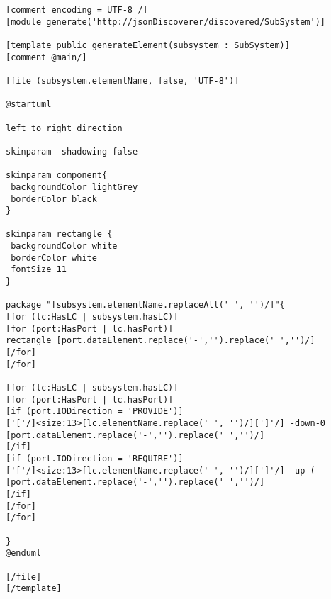 \begin{lstlisting}[caption=Acceleo template for generated textual description in PlantUML lanauge,label=code:acceleo_template_final]
[comment encoding = UTF-8 /]
[module generate('http://jsonDiscoverer/discovered/SubSystem')]

[template public generateElement(subsystem : SubSystem)]
[comment @main/]

[file (subsystem.elementName, false, 'UTF-8')]

@startuml

left to right direction

skinparam  shadowing false

skinparam component{
 backgroundColor lightGrey
 borderColor black
}

skinparam rectangle {
 backgroundColor white
 borderColor white
 fontSize 11
}

package "[subsystem.elementName.replaceAll(' ', '')/]"{
[for (lc:HasLC | subsystem.hasLC)]
[for (port:HasPort | lc.hasPort)]
rectangle [port.dataElement.replace('-','').replace(' ','')/]
[/for]
[/for]

[for (lc:HasLC | subsystem.hasLC)]
[for (port:HasPort | lc.hasPort)] 
[if (port.IODirection = 'PROVIDE')] 
['['/]<size:13>[lc.elementName.replace(' ', '')/][']'/] -down-0 [port.dataElement.replace('-','').replace(' ','')/]
[/if]
[if (port.IODirection = 'REQUIRE')]
['['/]<size:13>[lc.elementName.replace(' ', '')/][']'/] -up-( [port.dataElement.replace('-','').replace(' ','')/]
[/if]
[/for]
[/for]

}
@enduml

[/file]
[/template]
\end{lstlisting}
